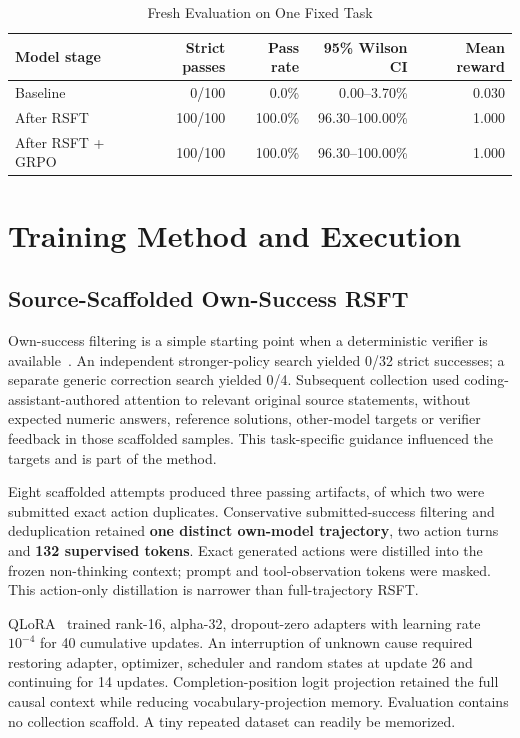 \documentclass[10pt,journal,onecolumn,a4paper]{IEEEtran}
\begin{document}
\begin{table}[!ht]
\centering
\caption{Fresh Evaluation on One Fixed Task}
\label{tab:results}
\begin{tabular}{lrrrr}
\toprule
Model stage & Strict passes & Pass rate & 95\% Wilson CI & Mean reward \\
\midrule
Baseline & 0/100 & 0.0\% & 0.00--3.70\% & 0.030 \\
After RSFT & 100/100 & 100.0\% & 96.30--100.00\% & 1.000 \\
After RSFT + GRPO & 100/100 & 100.0\% & 96.30--100.00\% & 1.000 \\
\bottomrule
\end{tabular}
\end{table}

\section{Training Method and Execution}
\subsection{Source-Scaffolded Own-Success RSFT}
Own-success filtering is a simple starting point when a deterministic verifier is available~\cite{rest}. An independent stronger-policy search yielded 0/32 strict successes; a separate generic correction search yielded 0/4. Subsequent collection used coding-assistant-authored attention to relevant original source statements, without expected numeric answers, reference solutions, other-model targets or verifier feedback in those scaffolded samples. This task-specific guidance influenced the targets and is part of the method.

Eight scaffolded attempts produced three passing artifacts, of which two were submitted exact action duplicates. Conservative submitted-success filtering and deduplication retained \textbf{one distinct own-model trajectory}, two action turns and \textbf{132 supervised tokens}. Exact generated actions were distilled into the frozen non-thinking context; prompt and tool-observation tokens were masked. This action-only distillation is narrower than full-trajectory RSFT.

QLoRA~\cite{qlora} trained rank-16, alpha-32, dropout-zero adapters with learning rate $10^{-4}$ for 40 cumulative updates. An interruption of unknown cause required restoring adapter, optimizer, scheduler and random states at update 26 and continuing for 14 updates. Completion-position logit projection retained the full causal context while reducing vocabulary-projection memory. Evaluation contains no collection scaffold. A tiny repeated dataset can readily be memorized.
\end{document}
